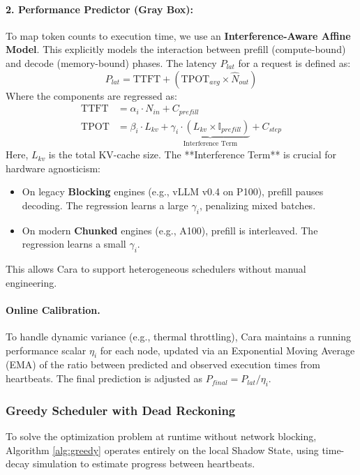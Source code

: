 \documentclass[letterpaper, anonymous, twocolumn, 10pt]{article}
\begin{document}
\paragraph{2. Performance Predictor (Gray Box):}
To map token counts to execution time, we use an \textbf{Interference-Aware Affine Model}. This explicitly models the interaction between prefill (compute-bound) and decode (memory-bound) phases.
The latency $P_{lat}$ for a request is defined as:
\begin{equation}
    P_{lat} = \text{TTFT} + (\text{TPOT}_{avg} \times \hat{N}_{out})
\end{equation}
Where the components are regressed as:
\begin{align}
    \text{TTFT} &= \alpha_i \cdot N_{in} + C_{prefill} \\
    \text{TPOT} &= \beta_i \cdot L_{kv} + \underbrace{\gamma_i \cdot (L_{kv} \times \mathbb{I}_{prefill})}_{\text{Interference Term}} + C_{step}
\end{align}
Here, $L_{kv}$ is the total KV-cache size. The **Interference Term** is crucial for hardware agnosticism:
\begin{itemize}
    \item On legacy \textbf{Blocking} engines (e.g., vLLM v0.4 on P100), prefill pauses decoding. The regression learns a large $\gamma_i$, penalizing mixed batches.
    \item On modern \textbf{Chunked} engines (e.g., A100), prefill is interleaved. The regression learns a small $\gamma_i$.
\end{itemize}
This allows Cara to support heterogeneous schedulers without manual engineering.

\paragraph{Online Calibration.}
To handle dynamic variance (e.g., thermal throttling), Cara maintains a running performance scalar $\eta_i$ for each node, updated via an Exponential Moving Average (EMA) of the ratio between predicted and observed execution times from heartbeats. The final prediction is adjusted as $P_{final} = P_{lat} / \eta_i$.

\subsubsection{Greedy Scheduler with Dead Reckoning} \label{section:alogrithm}

To solve the optimization problem at runtime without network blocking, Algorithm \ref{alg:greedy} operates entirely on the local Shadow State, using time-decay simulation to estimate progress between heartbeats.
\end{document}
